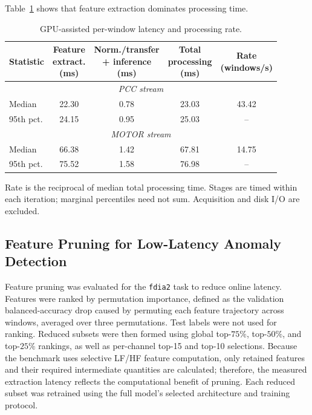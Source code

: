 \documentclass[letterpaper,journal]{IEEEtran}
\begin{document}
Table~\ref{tab:runtime_latency} shows that feature extraction dominates processing time.

\begin{table}[t]
\centering
\footnotesize
\caption{GPU-assisted per-window latency and processing rate.}
\label{tab:runtime_latency}
\renewcommand{\arraystretch}{1.15}
\setlength{\tabcolsep}{2pt}
\begin{tabular}{@{}lcccc@{}}
\hline
Statistic & \shortstack{Feature\\extract.\\(ms)} & \shortstack{Norm./transfer\\+ inference\\(ms)} & \shortstack{Total\\processing\\(ms)} & \shortstack{Rate\\(windows/s)} \\\hline
\hline\multicolumn{5}{c}{\textit{PCC stream}} \\\hline
Median & 22.30 & 0.78 & 23.03 & 43.42 \\
95th pct. & 24.15 & 0.95 & 25.03 & -- \\
\hline\multicolumn{5}{c}{\textit{MOTOR stream}} \\\hline
Median & 66.38 & 1.42 & 67.81 & 14.75 \\
95th pct. & 75.52 & 1.58 & 76.98 & -- \\
\hline\end{tabular}
\par\smallskip\begin{minipage}{\columnwidth}\scriptsize Rate is the reciprocal of median total processing time. Stages are timed within each iteration; marginal percentiles need not sum. Acquisition and disk I/O are excluded.\end{minipage}
\end{table}

\subsection{Feature Pruning for Low-Latency Anomaly Detection}
\label{sec:feature_pruning}

Feature pruning was evaluated for the \texttt{fdia2} task to reduce online latency. Features were ranked by permutation importance, defined as the validation balanced-accuracy drop caused by permuting each feature trajectory across windows, averaged over three permutations. Test labels were not used for ranking. Reduced subsets were then formed using global top-\(75\%\), top-\(50\%\), and top-\(25\%\) rankings, as well as per-channel top-15 and top-10 selections. Because the benchmark uses selective LF/HF feature computation, only retained features and their required intermediate quantities are calculated; therefore, the measured extraction latency reflects the computational benefit of pruning. Each reduced subset was retrained using the full model's selected architecture and training protocol.
\end{document}
